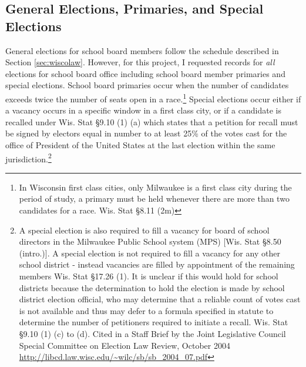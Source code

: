 \clearpage

\subsection{General Elections, Primaries, and Special Elections}

General elections for school board members follow the schedule described in Section 
\ref{sec:wiscolaw}. However, for this project, I requested records for \emph{all} elections 
for school board office including school board member primaries and special elections. 
School board primaries occur when the number of candidates exceeds twice 
the number of seats open in a race.\footnote{In Wisconsin first class cities, 
only Milwaukee is a first class city during the period of study, a primary must be held whenever there are more than two candidates for 
a race. Wis. Stat \S 8.11 (2m)} Special 
elections occur either if a vacancy occurs in a specific window in a first class 
city, or if a candidate is recalled under Wis. Stat \S 9.10 (1) (a) 
which states that a petition for recall must be signed by electors equal 
in number to at least 25\% of the votes cast for the office of President of the United 
States at the last election within the same jurisdiction.\footnote{
A special election is also required to fill a vacancy for board of school directors 
in the Milwaukee Public School system (MPS) [Wis. Stat \S 8.50 (intro.)]. A 
special election is not required to fill a vacancy for any other school district - 
instead vacancies are filled by appointment of the remaining members Wis. Stat \S 17.26 (1). It is unclear if this would hold for school districts because the determination 
to hold the election is made by school district election official, who may 
determine that a reliable count of votes cast is not available and thus may defer 
to a formula specified in statute to determine the number of petitioners required 
to initiate a recall. Wis. Stat \S 9.10 (1) (c) to (d). Cited in a Staff Brief by 
the Joint Legislative Council Special Committee on Election Law Review, October 
2004 \url{http://libcd.law.wisc.edu/~wilc/sb/sb\_2004\_07.pdf}}


